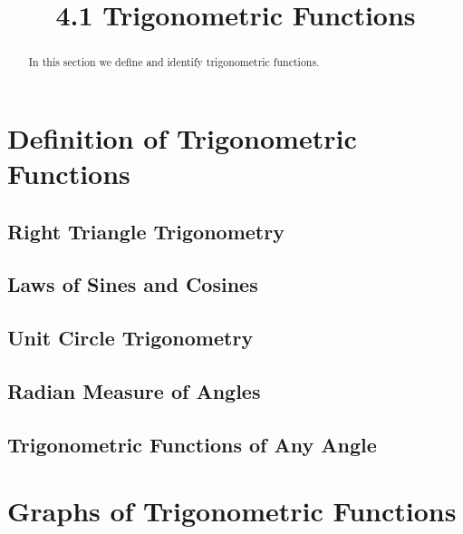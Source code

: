 \documentclass[handout]{ximera}
\title{4.1 Trigonometric Functions}
\begin{document}
\begin{abstract}
In this section we define and identify trigonometric functions.
\end{abstract}

\maketitle


\section{Definition of Trigonometric Functions}

\subsection{Right Triangle Trigonometry}

\subsection{Laws of Sines and Cosines}

\subsection{Unit Circle Trigonometry}

\subsection{Radian Measure of Angles}

\subsection{Trigonometric Functions of Any Angle}

\section{Graphs of Trigonometric Functions}
\end{document}
